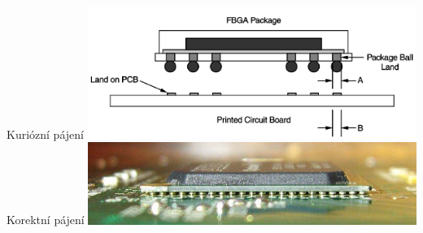 \documentclass{beamer}
\begin{document}
\begin{frame}
\begin{columns}
\begin{column}{0.5\textwidth}
\begin{center}
    Kuriózní pájení
    \newline
    \includegraphics[width=0.8\textwidth]{fig/bga-dimensions-diagram.png}
    \newline
    Korektní pájení
    \newline
    \includegraphics[width=0.8\textwidth]{fig/bga-soldering-proper.jpg}
  \end{center}
\end{column}
\end{columns}

\end{frame}
\end{document}
